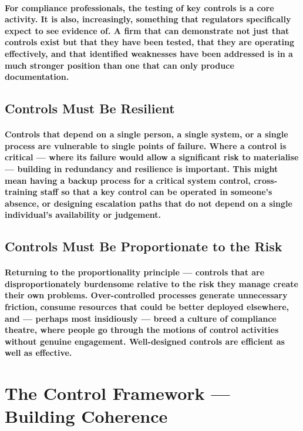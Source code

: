 \paragraph{For compliance professionals, the testing of key controls is a core activity. It is also, increasingly, something that regulators specifically expect to see evidence of. A firm that can demonstrate not just that controls exist but that they have been tested, that they are operating effectively, and that identified weaknesses have been addressed is in a much stronger position than one that can only produce documentation.}

\subsection{Controls Must Be Resilient}
\paragraph{Controls that depend on a single person, a single system, or a single process are vulnerable to single points of failure. Where a control is critical — where its failure would allow a significant risk to materialise — building in redundancy and resilience is important. This might mean having a backup process for a critical system control, cross-training staff so that a key control can be operated in someone's absence, or designing escalation paths that do not depend on a single individual's availability or judgement.}

\subsection{Controls Must Be Proportionate to the Risk}
\paragraph{Returning to the proportionality principle — controls that are disproportionately burdensome relative to the risk they manage create their own problems. Over-controlled processes generate unnecessary friction, consume resources that could be better deployed elsewhere, and — perhaps most insidiously — breed a culture of compliance theatre, where people go through the motions of control activities without genuine engagement. Well-designed controls are efficient as well as effective.}

\section{The Control Framework — Building Coherence}
